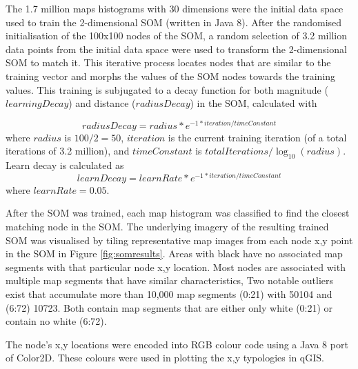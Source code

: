 \documentclass{nature}
\begin{document}
\begin{methods}
The 1.7 million maps histograms with 30 dimensions were the initial data space used to train the 2-dimensional SOM (written in Java 8\cite{Oracle2018}). After the randomised initialisation of the 100x100 nodes of the SOM, a random selection of 3.2 million data points from the initial data space were used to transform the 2-dimensional SOM to match it. This iterative process locates nodes that are similar to the training vector and morphs the values of the SOM nodes towards the training values. This training is subjugated to a decay function for both magnitude ($learningDecay$) and  distance ($radiusDecay$) in the SOM, calculated with


\begin{equation} 
radiusDecay = radius * e^{-1 * iteration / timeConstant}
\end{equation}
where $radius$ is $100/2=50$, $iteration$ is the current training iteration (of a total iterations of 3.2 million), and $timeConstant$ is $totalIterations / \log _{10} (radius)$. Learn decay is calculated as
\begin{equation} 
learnDecay = learnRate * e^{-1 * iteration / timeConstant}
\end{equation}
where $learnRate = 0.05$.

After the SOM was trained, each map histogram was classified to find the closest matching node in the SOM. The underlying imagery of the resulting trained SOM was visualised by tiling representative map images from each node x,y point in the SOM in Figure \ref{fig:somresults}. Areas with black have no associated map segments with that particular node x,y location. Most nodes are associated with multiple map segments that have similar characteristics, %
Two notable outliers exist that accumulate more than 10,000 map segments (0:21) with 50104 and (6:72) 10723. Both contain map segments that are either only white (0:21) or contain no white (6:72).





The node's x,y locations were encoded into RGB colour code using a Java 8 port of Color2D\cite{Jackle2017,Steiger2015}. These colours were used in plotting the x,y typologies in qGIS\cite{QGIS2009}.









\end{methods}
\end{document}
